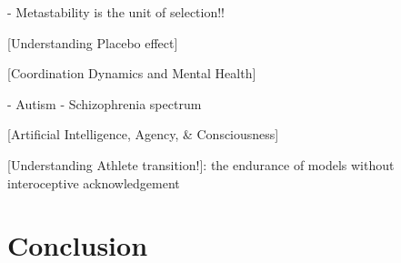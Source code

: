     - Metastability is the unit of selection!!

[Understanding Placebo effect]



[Coordination Dynamics and Mental Health]

  - Autism - Schizophrenia spectrum

[Artificial Intelligence, Agency, & Consciousness]


[Understanding Athlete transition!]:  the endurance of models without interoceptive acknowledgement


\section{Conclusion}
